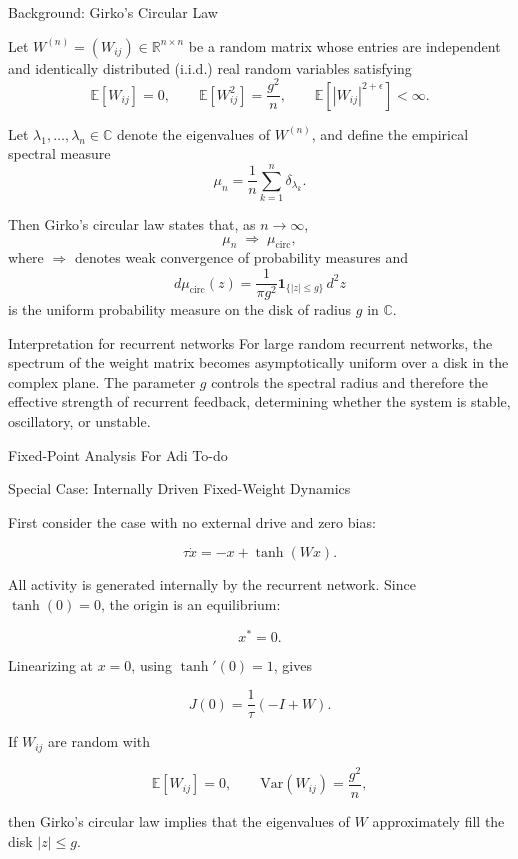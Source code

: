 \documentclass[
11pt,notheorems,hyperref={pdfauthor=whatever}
]{beamer}
\begin{document}
\begin{frame}{Background: Girko's Circular Law}
\small

Let \(W^{(n)} = (W_{ij}) \in \mathbb{R}^{n \times n}\) be a random matrix whose entries are
independent and identically distributed (i.i.d.) real random variables satisfying
\[
\mathbb{E}[W_{ij}] = 0,
\qquad
\mathbb{E}[W_{ij}^2] = \frac{g^2}{n},
\qquad
\mathbb{E}[|W_{ij}|^{2+\epsilon}] < \infty.
\]

Let \(\lambda_1,\dots,\lambda_n \in \mathbb{C}\) denote the eigenvalues of \(W^{(n)}\), and define the empirical spectral measure
\[
\mu_n
=
\frac{1}{n}\sum_{k=1}^n \delta_{\lambda_k}.
\]

Then Girko's circular law states that, as \(n \to \infty\),
\[
\mu_n \;\Rightarrow\; \mu_{\mathrm{circ}},
\]
where \(\Rightarrow\) denotes weak convergence of probability measures and
\[
d\mu_{\mathrm{circ}}(z)
=
\frac{1}{\pi g^2}\mathbf{1}_{\{|z|\le g\}}\, d^2 z
\]
is the uniform probability measure on the disk of radius \(g\) in \(\mathbb{C}\).

\vspace{0.5em}

\begin{block}{Interpretation for recurrent networks}
For large random recurrent networks, the spectrum of the weight matrix becomes asymptotically uniform over a disk in the complex plane. The parameter \(g\) controls the spectral radius and therefore the effective strength of recurrent feedback, determining whether the system is stable, oscillatory, or unstable.
\end{block}
\end{frame}

\begin{frame}{Fixed-Point Analysis}
    For Adi To-do
\end{frame}

\begin{frame}{Special Case: Internally Driven Fixed-Weight Dynamics}
\small

First consider the case with no external drive and zero bias:

\[
\tau \dot{x}
=
-x+\tanh(Wx).
\]

All activity is generated internally by the recurrent network. Since
\(\tanh(0)=0\), the origin is an equilibrium:

\[
x^\ast=0.
\]

Linearizing at \(x=0\), using \(\tanh'(0)=1\), gives

\[
J(0)=\frac{1}{\tau}(-I+W).
\]

If \(W_{ij}\) are random with

\[
\mathbb{E}[W_{ij}]=0,
\qquad
\mathrm{Var}(W_{ij})=\frac{g^2}{n},
\]

then Girko's circular law implies that the eigenvalues of \(W\) approximately
fill the disk \(|z|\leq g\).

\end{frame}
\end{document}
